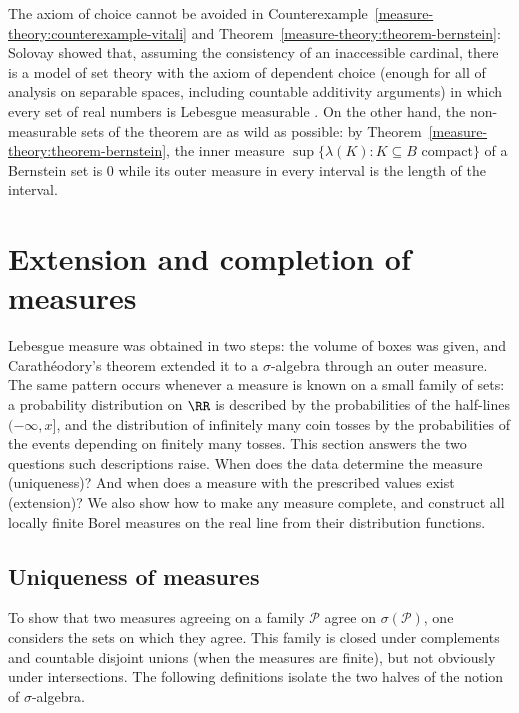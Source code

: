 \begin{remark}\label{measure-theory:remark-solovay}
The axiom of choice cannot be avoided in Counterexample~\ref{measure-theory:counterexample-vitali} and Theorem~\ref{measure-theory:theorem-bernstein}: Solovay showed that, assuming the consistency of
an inaccessible cardinal, there is a model of set theory with the axiom of dependent choice (enough for all of analysis on separable spaces, including countable additivity arguments) in which every set
of real numbers is Lebesgue measurable \cite{solovay-1970}. On the other hand, the non-measurable sets of the theorem are as wild as possible: by Theorem~\ref{measure-theory:theorem-bernstein}, the
inner measure $\sup\{\lambda(K) : K \subseteq B \text{ compact}\}$ of a Bernstein set is $0$ while its outer measure in every interval is the length of the interval.
\end{remark}

\section{Extension and completion of measures}\label{measure-theory:section-extension}

Lebesgue measure was obtained in two steps: the volume of boxes was given, and Carath\'eodory's theorem extended it to a $\sigma$-algebra through an outer measure. The same pattern occurs whenever a
measure is known on a small family of sets: a probability distribution on $\RR$ is described by the probabilities of the half-lines $(-\infty, x]$, and the distribution of infinitely many coin tosses by
the probabilities of the events depending on finitely many tosses. This section answers the two questions such descriptions raise. When does the data determine the measure (uniqueness)? And when
does a measure with the prescribed values exist (extension)? We also show how to make any measure complete, and construct all locally finite Borel measures on the real line from their distribution
functions.

\subsection{Uniqueness of measures}\label{measure-theory:subsection-uniqueness}

To show that two measures agreeing on a family $\mathcal{P}$ agree on $\sigma(\mathcal{P})$, one considers the sets on which they agree. This family is closed under complements and countable
disjoint unions (when the measures are finite), but not obviously under intersections. The following definitions isolate the two halves of the notion of $\sigma$-algebra.

